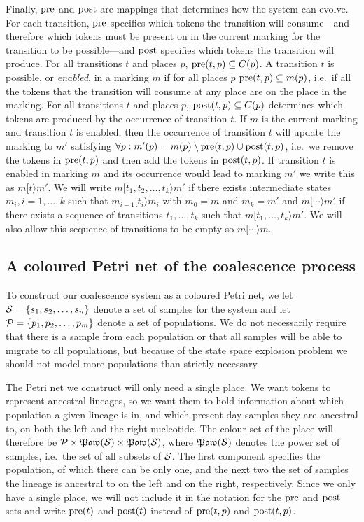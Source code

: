Finally, $\operatorname{pre}$ and $\operatorname{post}$ are mappings that determines how the system can evolve. For each transition, $\operatorname{pre}$ specifies which tokens the transition will consume---and therefore which tokens must be present on in the current marking for the transition to be possible---and $\operatorname{post}$ specifies which tokens the transition will produce. For all transitions $t$ and places $p$, $\operatorname{pre}(t,p) \subseteq C(p)$. A transition $t$ is possible, or \emph{enabled}, in a marking $m$ if for all places $p$ $\operatorname{pre}(t,p)\subseteq m(p)$, i.e.\ if all the tokens that the transition will consume at any place are on the place in the marking. For all transitions $t$ and places $p$, $\operatorname{post}(t,p) \subseteq C(p)$ determines which tokens are produced by the occurrence of transition $t$. If $m$ is the current marking and transition $t$ is enabled, then the occurrence of transition $t$ will update the marking to $m'$ satisfying $\forall p: m'(p) = m(p) \setminus \operatorname{pre}(t,p) \cup \operatorname{post}(t,p)$, i.e.\ we remove the tokens in $\operatorname{pre}(t,p)$ and then add the tokens in $\operatorname{post}(t,p)$. If transition $t$ is enabled in marking $m$ and its occurrence would lead to marking $m'$ we write this as $m[t\rangle m'$. We will write $m[t_1,t_2,\ldots,t_k\rangle m'$ if there exists intermediate states $m_i,i=1,\ldots,k$ such that $m_{i-1}[t_i\rangle m_i$ with $m_0=m$ and $m_k=m'$ and $m[\cdots\rangle m'$ if there exists a sequence of transitions $t_1,\ldots,t_k$ such that $m[t_1,\ldots,t_k\rangle m'$. We will also allow this sequence of transitions to be empty so $m[\cdots\rangle m$.

\subsection{A coloured Petri net of the coalescence process}

To construct our coalescence system as a coloured Petri net, we let $\mathcal{S}=\{s_1,s_2,\ldots,s_n\}$ denote a set of samples for the system and let $\mathcal{P}=\{p_1,p_2,\ldots,p_m\}$ denote a set of populations. We do not necessarily require that there is a sample from each population or that all samples will be able to migrate to all populations, but because of the state space explosion problem we should not model more populations than strictly necessary.

The Petri net we construct will only need a single place. We want tokens to represent ancestral lineages, so we want them to hold information about which population a given lineage is in, and which present day samples they are ancestral to, on both the left and the right nucleotide. The colour set of the place will therefore be $\mathcal{P}\times\mathfrak{Pow}(\mathcal{S})\times\mathfrak{Pow}(\mathcal{S})$, where $\mathfrak{Pow}(\mathcal{S})$ denotes the power set of samples, i.e.\ the set of all subsets of $\mathcal{S}$. The first component specifies the population, of which there can be only one, and the next two the set of samples the lineage is ancestral to on the left and on the right, respectively. Since we only have a single place, we will not include it in the notation for the $\operatorname{pre}$ and $\operatorname{post}$ sets and write $\operatorname{pre}(t)$ and $\operatorname{post}(t)$ instead of $\operatorname{pre}(t,p)$ and $\operatorname{post}(t,p)$.


